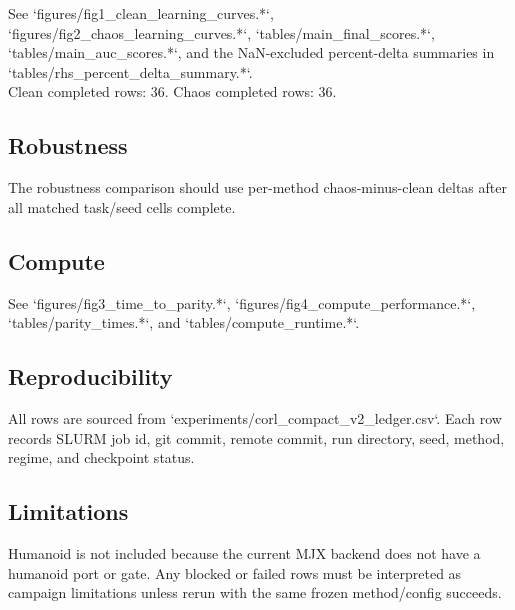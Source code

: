 \documentclass{article}
\begin{document}
See `figures/fig1\_clean\_learning\_curves.*`, `figures/fig2\_chaos\_learning\_curves.*`, `tables/main\_final\_scores.*`, `tables/main\_auc\_scores.*`, and the NaN-excluded percent-delta summaries in `tables/rhs\_percent\_delta\_summary.*`.\\

Clean completed rows: 36. Chaos completed rows: 36.\\

\subsection*{Robustness}

The robustness comparison should use per-method chaos-minus-clean deltas after all matched task/seed cells complete.\\

\subsection*{Compute}

See `figures/fig3\_time\_to\_parity.*`, `figures/fig4\_compute\_performance.*`, `tables/parity\_times.*`, and `tables/compute\_runtime.*`.\\

\subsection*{Reproducibility}

All rows are sourced from `experiments/corl\_compact\_v2\_ledger.csv`. Each row records SLURM job id, git commit, remote commit, run directory, seed, method, regime, and checkpoint status.\\

\subsection*{Limitations}

Humanoid is not included because the current MJX backend does not have a humanoid port or gate. Any blocked or failed rows must be interpreted as campaign limitations unless rerun with the same frozen method/config succeeds.\\
\end{document}
